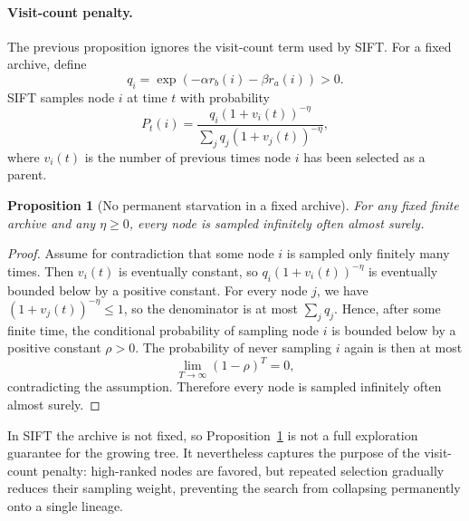 \documentclass{article}
\newtheorem{proposition}{Proposition}
\begin{document}
\paragraph{Visit-count penalty.}
The previous proposition ignores the visit-count term used by SIFT. For a fixed
archive, define
\[
    q_i
    =
    \exp\!\left(
        -\alpha r_{b}(i)
        -\beta r_{a}(i)
    \right)
    >0 .
\]
SIFT samples node $i$ at time $t$ with probability
\[
    P_t(i)
    =
    \frac{
        q_i(1+v_i(t))^{-\eta}
    }{
        \sum_j q_j(1+v_j(t))^{-\eta}
    },
\]
where $v_i(t)$ is the number of previous times node $i$ has been selected as a
parent.

\begin{proposition}[No permanent starvation in a fixed archive]
\label{prop:no_starvation}
For any fixed finite archive and any $\eta\ge 0$, every node is sampled
infinitely often almost surely.
\end{proposition}

\begin{proof}
Assume for contradiction that some node $i$ is sampled only finitely many times.
Then $v_i(t)$ is eventually constant, so
$q_i(1+v_i(t))^{-\eta}$ is eventually bounded below by a positive constant.
For every node $j$, we have $(1+v_j(t))^{-\eta}\le 1$, so the denominator is at
most $\sum_j q_j$. Hence, after some finite time, the conditional probability of
sampling node $i$ is bounded below by a positive constant $\rho>0$. The
probability of never sampling $i$ again is then at most
\[
    \lim_{T\to\infty}(1-\rho)^T=0,
\]
contradicting the assumption. Therefore every node is sampled infinitely often
almost surely.
\end{proof}

In SIFT the archive is not fixed, so Proposition~\ref{prop:no_starvation} is not
a full exploration guarantee for the growing tree. It nevertheless captures the
purpose of the visit-count penalty: high-ranked nodes are favored, but repeated
selection gradually reduces their sampling weight, preventing the search from
collapsing permanently onto a single lineage.
\end{document}
